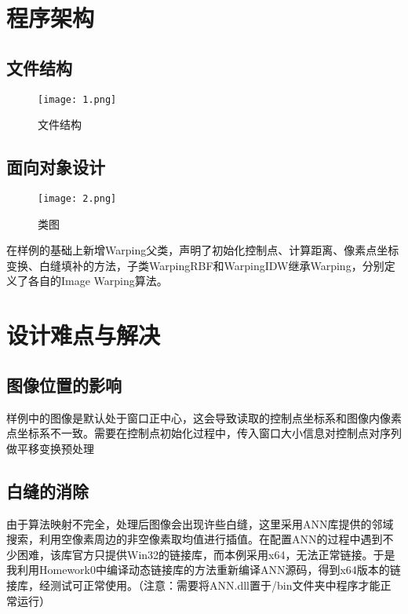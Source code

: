 \documentclass[14pt]{scrartcl} %
\begin{document}
\pagebreak
\section{程序架构}
\subsection{文件结构}
\begin{figure}[h] %
	\centering
	\texttt{[image: 1.png]} %
	\caption{文件结构}
\end{figure}


\pagebreak
\subsection{面向对象设计}

\begin{figure}[h] %
	\centering
	\texttt{[image: 2.png]} %
	\caption{类图}
\end{figure}

在样例的基础上新增Warping父类，声明了初始化控制点、计算距离、像素点坐标变换、白缝填补的方法，子类WarpingRBF和WarpingIDW继承Warping，分别定义了各自的Image Warping算法。

\pagebreak
\section{设计难点与解决}

\subsection{图像位置的影响}

样例中的图像是默认处于窗口正中心，这会导致读取的控制点坐标系和图像内像素点坐标系不一致。需要在控制点初始化过程中，传入窗口大小信息对控制点对序列做平移变换预处理

\subsection{白缝的消除}

由于算法映射不完全，处理后图像会出现许些白缝，这里采用ANN库提供的邻域搜索，利用空像素周边的非空像素取均值进行插值。在配置ANN的过程中遇到不少困难，该库官方只提供Win32的链接库，而本例采用x64，无法正常链接。于是我利用Homework0中编译动态链接库的方法重新编译ANN源码，得到x64版本的链接库，经测试可正常使用。（注意：需要将ANN.dll置于/bin文件夹中程序才能正常运行）
\end{document}
